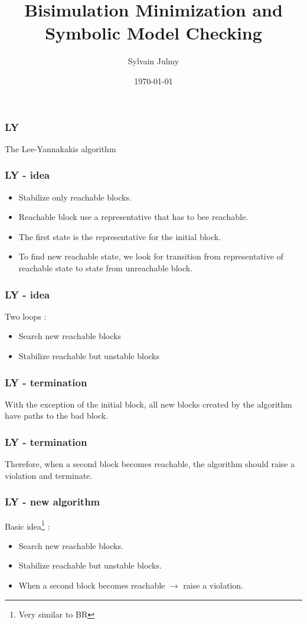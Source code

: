 \documentclass[11pt,handout]{beamer}
\title[Computer Chess]{Bisimulation Minimization and Symbolic Model Checking}
\author{Sylvain Julmy}
\date{\today}
\begin{document}
\maketitle

\begin{frame}
  \frametitle{LY}
  The Lee-Yannakakis algorithm
\end{frame}

\begin{frame}
  \frametitle{LY - idea}
  \begin{itemize}
  \item Stabilize only reachable blocks.
  \item Reachable block use a representative that has to bee reachable.
  \item The first state is the representative for the initial block.
  \item To find new reachable state, we look for transition from representative
    of reachable state to state from unreachable block.
  \end{itemize}
\end{frame}

\begin{frame}
  \frametitle{LY - idea}
  Two loops :
  \begin{itemize}
  \item Search new reachable blocks
  \item Stabilize reachable but unstable blocks
  \end{itemize}
\end{frame}

\begin{frame}
  \frametitle{LY - termination}
  With the exception of the initial block, all new blocks created by the
  algorithm have paths to the bad block.
\end{frame}

\begin{frame}
  \frametitle{LY - termination}
  Therefore, when a second block becomes reachable, the algorithm should raise a
  violation and terminate.
\end{frame}

\begin{frame}
  \frametitle{LY - new algorithm}
  Basic idea\footnote{Very similar to BR} :
  \begin{itemize}
  \item Search new reachable blocks.
  \item Stabilize reachable but unstable blocks.
  \item When a second block becomes reachable $\to$ raise a violation.
  \end{itemize}
\end{frame}
\end{document}
